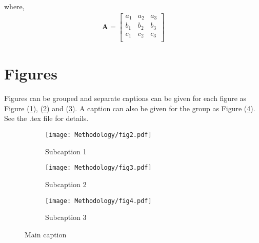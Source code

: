 where,
\begin{eqnarray}
	\mathbf A = \begin{bmatrix}
	             a_1 & a_2 & a_3 \\
	             b_1 & b_2 & b_3 \\
	             c_1 & c_2 & c_3 \\
	      	    \end{bmatrix} \label{eq.matrixA}
\end{eqnarray}


\section{Figures}

Figures can be grouped and separate captions can be given for each figure as Figure (\ref{fig:subcaption1}), (\ref{fig:subcaption2}) and (\ref{fig:subcaption3}). A caption can also be given for the group as Figure (\ref{fig:maincaption}). See the .tex file for details. 

\begin{figure}
    \centering
    \begin{subfigure}[b]{0.48\textwidth}
        \centering
        \texttt{[image: Methodology/fig2.pdf]}
        \caption{Subcaption 1}
        \label{fig:subcaption1}
    \end{subfigure}
    \hfill
    \begin{subfigure}[b]{0.48\textwidth}
        \centering
        \texttt{[image: Methodology/fig3.pdf]}
        \caption{Subcaption 2}
        \label{fig:subcaption2}
    \end{subfigure}
    \hfill
    \begin{subfigure}[b]{0.48\textwidth}
        \centering
        \texttt{[image: Methodology/fig4.pdf]}
        \caption{Subcaption 3}
        \label{fig:subcaption3}
    \end{subfigure}
  \caption{Main caption}
    \label{fig:maincaption}
\end{figure}


